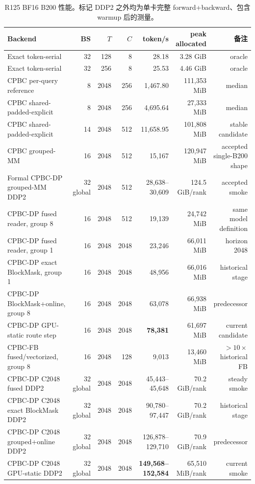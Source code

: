 \documentclass[UTF8,twocolumn,10pt,a4paper]{ctexart}
\newcommand{\DP}{\textsf{CPBC-DP}}
\newcommand{\FB}{\textsf{CPBC-FB}}
\begin{document}
\begin{table}[t]
\centering
\caption{R125 BF16 B200 性能。标记 DDP2 之外均为单卡完整 forward+backward、包含 warmup 后的测量。}
\label{tab:performance}
\small
\begin{tabular}{lrrrrrr}
\toprule
Backend & BS & $T$ & $C$ & token/s & peak allocated & 备注 \\
\midrule
Exact token-serial & 32 & 128 & 8 & 28.18 & 3.28 GiB & oracle \\
Exact token-serial & 32 & 256 & 8 & 25.53 & 4.46 GiB & oracle \\
CPBC per-query reference & 8 & 2048 & 256 & 1,467.80 & 111,353 MiB & median \\
CPBC shared-padded-explicit & 8 & 2048 & 256 & 4,695.64 & 27,333 MiB & median \\
CPBC shared-padded-explicit & 14 & 2048 & 512 & 11,658.95 & 101,808 MiB & stable candidate \\
CPBC grouped-MM & 16 & 2048 & 512 & 15,167 & 120,947 MiB & accepted single-B200 shape \\
Formal \DP{} grouped-MM DDP2 & 32 global & 2048 & 512 & 28,638--30,609 & 124.5 GiB/rank & accepted smoke \\
\DP{} fused reader, group 8 & 16 & 2048 & 512 & 19,139 & 24,742 MiB & same model definition \\
\DP{} fused reader, group 1 & 16 & 2048 & 2048 & 23,246 & 66,011 MiB & horizon 2048 \\
\DP{} exact BlockMask, group 1 & 16 & 2048 & 2048 & 48,956 & 66,016 MiB & historical stage \\
\DP{} BlockMask+online, group 8 & 16 & 2048 & 2048 & 63,078 & 66,938 MiB & predecessor \\
\DP{} GPU-static route step & 16 & 2048 & 2048 & \textbf{78,381} & 61,697 MiB & current candidate \\
\FB{} fused/vectorized, group 8 & 16 & 2048 & 128 & 9,013 & 13,460 MiB & $>10\times$ historical FB \\
\DP{} C2048 fused DDP2 & 32 global & 2048 & 2048 & 45,443--45,648 & 70.2 GiB/rank & steady smoke \\
\DP{} C2048 exact BlockMask DDP2 & 32 global & 2048 & 2048 & 90,780--97,447 & 70.2 GiB/rank & historical stage \\
\DP{} C2048 grouped+online DDP2 & 32 global & 2048 & 2048 & 126,878--129,710 & 70.9 GiB/rank & predecessor \\
\DP{} C2048 GPU-static DDP2 & 32 global & 2048 & 2048 & \textbf{149,568--152,584} & 65,510 MiB/rank & current smoke \\
\bottomrule
\end{tabular}
\end{table}
\end{document}
